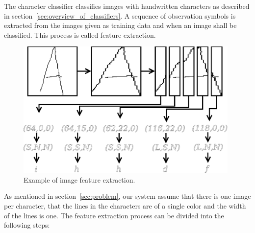 
The character classifier classifies images with handwritten characters as described in section~\ref{sec:overview_of_classifiers}. A sequence of observation symbols is extracted from the images given as training data and when an image shall be classified. This process is called feature extraction. 

    \begin{figure}[htb] 
      \begin{center}
	\leavevmode
	\includegraphics[width=110mm]{image_feature_extraction.eps}%
      \end{center}
      \caption{Example of image feature extraction.}
      \label{fig:image_feature_extraction}
    \end{figure}

As mentioned in section~\ref{sec:problem}, our system assume that there is one image per character, that the lines in the characters are of a single color and the width of the lines is one. The feature extraction process can be divided into the following steps:


